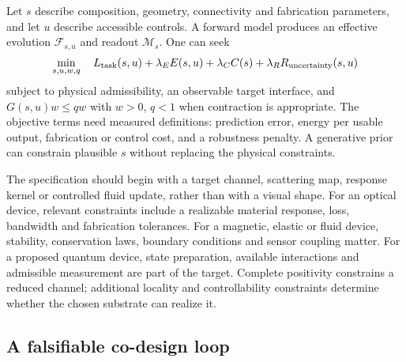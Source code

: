 Let $s$ describe composition, geometry, connectivity and fabrication
parameters, and let $u$ describe accessible controls. A forward model
produces an effective evolution $\mathcal F_{s,u}$ and readout
$\mathcal M_s$. One can seek
\[
 \min_{s,u,w,q}\quad
 L_{\rm task}(s,u)+\lambda_E E(s,u)+\lambda_C C(s)
 +\lambda_R R_{\rm uncertainty}(s,u)
\]
subject to physical admissibility, an observable target interface, and
$G(s,u)w\le qw$ with $w>0$, $q<1$ when contraction is appropriate.
The objective terms need measured definitions: prediction error,
energy per usable output, fabrication or control cost, and a robustness
penalty. A generative prior can constrain plausible $s$ without replacing
the physical constraints.

The specification should begin with a target channel, scattering map,
response kernel or controlled fluid update, rather than with a visual
shape. For an optical device, relevant constraints include a realizable
material response, loss, bandwidth and fabrication tolerances. For a
magnetic, elastic or fluid device, stability, conservation laws, boundary
conditions and sensor coupling matter. For a proposed quantum device,
state preparation, available interactions and admissible measurement are
part of the target. Complete positivity constrains a reduced channel;
additional locality and controllability constraints determine whether the
chosen substrate can realize it.

\subsection{A falsifiable co-design loop}

